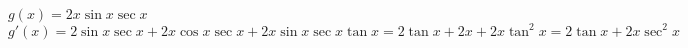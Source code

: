 {$g(x) = 2x\sin x \sec x$
}
{$g'(x) = 2\sin x\sec x+2x\cos x \sec x + 2x\sin x\sec x\tan x = 2\tan x+2x+2x\tan^2x = 2\tan x+2x\sec^2x$
}
